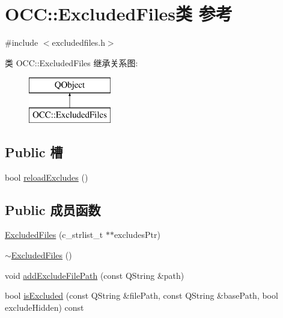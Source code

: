 \hypertarget{class_o_c_c_1_1_excluded_files}{}\section{O\+CC\+:\+:Excluded\+Files类 参考}
\label{class_o_c_c_1_1_excluded_files}


{\ttfamily \#include $<$excludedfiles.\+h$>$}

类 O\+CC\+:\+:Excluded\+Files 继承关系图\+:\begin{figure}[H]
\begin{center}
\leavevmode
\includegraphics[height=2.000000cm]{class_o_c_c_1_1_excluded_files}
\end{center}
\end{figure}
\subsection*{Public 槽}
\begin{DoxyCompactItemize}
\item 
bool \hyperlink{class_o_c_c_1_1_excluded_files_a725cf3074415738e3e2a4cc5aa881ef4}{reload\+Excludes} ()
\end{DoxyCompactItemize}
\subsection*{Public 成员函数}
\begin{DoxyCompactItemize}
\item 
\hyperlink{class_o_c_c_1_1_excluded_files_af374d99e037621fe638dfa33c89bf095}{Excluded\+Files} (c\+\_\+strlist\+\_\+t $\ast$$\ast$excludes\+Ptr)
\item 
\hyperlink{class_o_c_c_1_1_excluded_files_afae534d13d17cebef5739e1efebbd3c6}{$\sim$\+Excluded\+Files} ()
\item 
void \hyperlink{class_o_c_c_1_1_excluded_files_abd7010e5b9734d3870ce40e607b16a53}{add\+Exclude\+File\+Path} (const Q\+String \&path)
\item 
bool \hyperlink{class_o_c_c_1_1_excluded_files_ae54a8228ca921d2b859c6bc22c897302}{is\+Excluded} (const Q\+String \&file\+Path, const Q\+String \&base\+Path, bool exclude\+Hidden) const
\end{DoxyCompactItemize}
